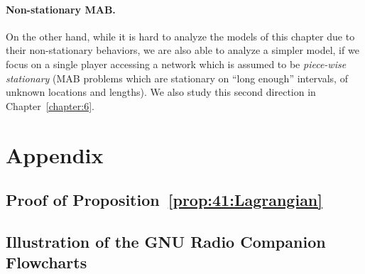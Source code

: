 

\paragraph{Non-stationary MAB.}
%
On the other hand, while it is hard to analyze the models of this chapter due to their non-stationary behaviors, we are also able to analyze a simpler model, if we focus on a single player accessing a network which is assumed to be \emph{piece-wise stationary}
(MAB problems which are stationary on ``long enough'' intervals, of unknown locations and lengths).
%
We also study this second direction in Chapter~\ref{chapter:6}.


\newpage
\section{Appendix}
\label{sec:4:appendix}

\subsection{Proof of Proposition~\ref{prop:41:Lagrangian}}
\label{sec:4:proofLagrangian}





\newpage
\subsection{Illustration of the GNU Radio Companion Flowcharts}
\label{sec:4:IllustrationFlowcharts}


